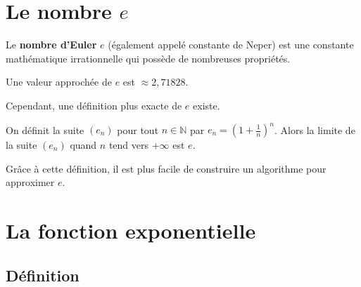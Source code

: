 


	

	
	
	\section{Le nombre \texorpdfstring{$e$}{e}}
	
	Le \textbf{nombre d'Euler} $e$ (également appelé constante de Neper) est une constante mathématique irrationnelle qui possède de nombreuses propriétés.
	
	\begin{formula}
		Une valeur approchée de $e$ est $\approx 2,71828$.
	\end{formula}
	
	\begin{nosummary}
		Cependant, une définition plus exacte de $e$ existe.
		
		\begin{formula}
			On définit la suite $(e_n)$ pour tout $n \in \mathbb{N}$ par $e_n = \left(1 + \frac{1}{n}\right)^n$.
			Alors la limite de la suite $(e_n)$ quand $n$ tend vers $+\infty$ est $e$.
		\end{formula}
		
		\begin{tip}
			Grâce à cette définition, il est plus facile de construire un algorithme pour approximer $e$.
		\end{tip}
	\end{nosummary}
	
	\section{La fonction exponentielle}
	
	\subsection{Définition}
	\label{definition}
	
